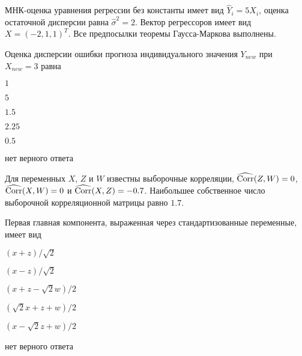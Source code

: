 \begin{question}
МНК-оценка уравнения регрессии без константы имеет вид $\hat Y_i = 5 X_i$, 
оценка остаточной дисперсии равна $\hat\sigma^2 = 2$. 
Вектор регрессоров имеет вид $X= (-2, 1, 1)^T$. 
Все предпосылки теоремы Гаусса-Маркова выполнены.

Оценка дисперсии ошибки прогноза индивидуального значения $Y_{new}$ при $X_{new}=3$ равна
\begin{answerlist}
  \item $1$
  \item $5$
  \item $1.5$
  \item $2.25$
  \item $0.5$
  \item нет верного ответа
\end{answerlist}
\end{question}


\begin{comment}
\begin{question}
МНК-оценка уравнения регрессии имеет вид $\hat Y_i = 1.56 + 0.21 X_i$, оценка остаточной дисперсии равна $\hat\sigma^2 = 0.04$. Транспонированная матрица регрессоров имеет вид 
$\begin{pmatrix}
1 & 1 & 1 & 1 & 1 \\
1 & 3 & 4 & 5 & 7 \\
\end{pmatrix}$. Отношение ширин 90\%-х доверительных интервалов для индивидуального значения $Y_{n+1}$ и ожидаемого значения $Y_{n+1}$ при $X_{n+1}=3$ равно
\begin{answerlist}
  \item $1$
  \item $5$
  \item $1.5$
  \item $2.25$
  \item $0.5$
  \item нет верного ответа
\end{answerlist}
\end{question}
\end{comment}


\begin{question}
Для переменных $X$, $Z$ и $W$ известны выборочные корреляции, $\operatorname{\widehat{\operatorname{Corr}}}(Z, W) = 0$, $\operatorname{\widehat{\operatorname{Corr}}}(X, W)=0$ и $\operatorname{\widehat{\operatorname{Corr}}}(X, Z) = -0.7$. 
Наибольшее собственное число выборочной корреляционной матрицы равно $1.7$. 

Первая главная компонента, выраженная через стандартизованные переменные, имеет вид
\begin{answerlist}
  \item $(x + z)/\sqrt{2}$
  \item $(x - z)/\sqrt{2}$
  \item $(x + z - \sqrt{2}w)/2$
  \item $(\sqrt{2} x + z +w)/2$
  \item $(x -\sqrt{2}z + w)/2$
  \item нет верного ответа
\end{answerlist}
\end{question}

